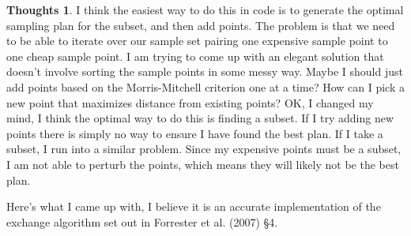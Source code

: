 \documentclass[11pt]{article}
\theoremstyle{definition}
\newtheorem*{thoughts}{Thoughts}
\begin{document}
\begin{thoughts}
I think the easiest way to do this in code is to generate the optimal sampling plan for the subset, and then add points.
The problem is that we need to be able to iterate over our sample set pairing one expensive sample point to one cheap sample point.
I am trying to come up with an elegant solution that doesn't involve sorting the sample points in some messy way. Maybe I should just add
points based on the Morris-Mitchell criterion one at a time? How can I pick a new point that maximizes distance from existing points?
OK, I changed my mind, I think the optimal way to do this is finding a subset. If I try adding new points there is simply no way to ensure I have found the best plan.
If I take a subset, I run into a similar problem. Since my expensive points must be a subset, I am not able to perturb the points, which means they will likely not be
the best plan.

\end{thoughts}

Here's what I came up with, I believe it is an accurate implementation of the exchange algorithm set out in Forrester et al. (2007) \S 4. 
\end{document}
